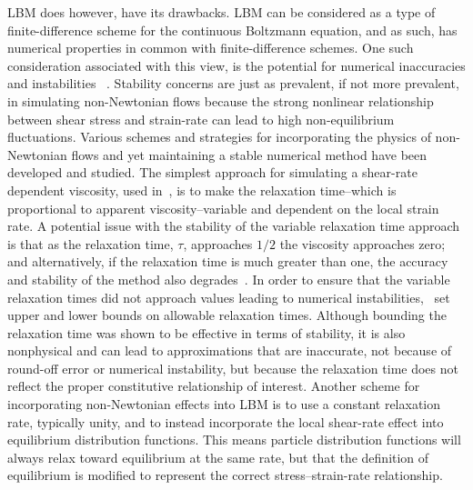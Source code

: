\documentclass{article}
\begin{document}
LBM does however, have its drawbacks.
LBM can be considered as a type of finite-difference scheme for the continuous Boltzmann equation, and as such, has numerical properties in common with finite-difference schemes. %
One such consideration associated with this view, is the potential for numerical inaccuracies and instabilities ~\cite{sterling1993stability,sterling1996stability,bawazeer2013stability,lallemand2000theory}. %
Stability concerns are just as prevalent, if not more prevalent, in simulating non-Newtonian flows because the strong nonlinear relationship between shear stress and strain-rate can lead to high non-equilibrium fluctuations. %
Various schemes and strategies for incorporating the physics of non-Newtonian flows and yet maintaining a stable numerical method have been developed and studied.
The simplest approach for simulating a shear-rate dependent viscosity, used in~\cite{boyd2006second,chen2014simulations,fallah2012multiple,tang2011bingham,svec2011flow,svec2012free}, is to make the relaxation time--which is proportional to apparent viscosity--variable and dependent on the local strain rate.
A potential issue with the stability of the variable relaxation time approach is that as the relaxation time, $\tau$, approaches $1/2$ the viscosity approaches zero; and alternatively, if the relaxation time is much greater than one, the accuracy and stability of the method also degrades~\cite{latt2007hydrodynamic}.
In order to ensure that the variable relaxation times did not approach values leading to numerical instabilities,~\cite{svec2011flow,svec2012free,gabbanelli2005lattice} set upper and lower bounds on allowable relaxation times.
Although bounding the relaxation time was shown to be effective in terms of stability, it is also nonphysical and can lead to approximations that are inaccurate, not because of round-off error or numerical instability, but because the relaxation time does not reflect the proper constitutive relationship of interest.
Another scheme for incorporating non-Newtonian effects into LBM is to use a constant relaxation rate, typically unity, and to instead incorporate the local shear-rate effect into equilibrium distribution functions.
This means particle distribution functions will always relax toward equilibrium at the same rate, but that the definition of equilibrium is modified to represent the correct stress--strain-rate relationship.
\end{document}
